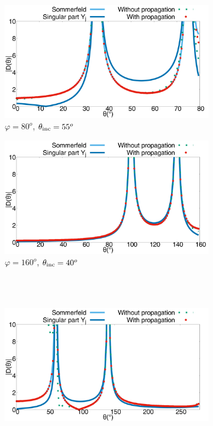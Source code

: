 \begin{figure}[h!]
\centering
\begin{subfigure}[b]{0.49\textwidth}
        \includegraphics[width=\textwidth]{images/chapter2/Figure9a.pdf}
        \caption{$\varphi = 80^o$, $\theta_{\rm inc} = 55^o$}
        \label{chapter5:figure13a}
    \end{subfigure}
\begin{subfigure}[b]{0.49\textwidth}
        \includegraphics[width=\textwidth]{images/chapter2/Figure9b.pdf}
        \caption{$\varphi = 160^o$, $\theta_{\rm inc} = 40^o$}
        \label{chapter5:figure13b}
    \end{subfigure}
\\
~\\
\begin{subfigure}[b]{0.49\textwidth}
        \includegraphics[width=\textwidth]{images/chapter2/Figure9c.pdf}

\end{subfigure}
\end{figure}
